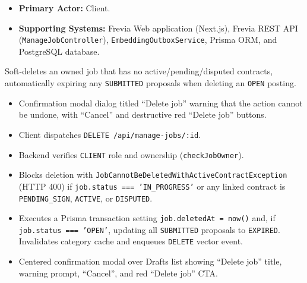 
\begin{itemize}[leftmargin=1.6em,topsep=3pt,itemsep=2pt,parsep=0pt,label=$\bullet$]
    \item \textbf{Primary Actor:} Client.
    \item \textbf{Supporting Systems:} Frevia Web application (Next.js), Frevia REST API (\texttt{ManageJobController}), \texttt{EmbeddingOutboxService}, Prisma ORM, and PostgreSQL database.
\end{itemize}

\noindent Soft-deletes an owned job that has no active/pending/disputed contracts, automatically expiring any \texttt{SUBMITTED} proposals when deleting an \texttt{OPEN} posting.

\begin{itemize}[leftmargin=1.6em,topsep=3pt,itemsep=2pt,parsep=0pt,label=$\bullet$]
    \item Confirmation modal dialog titled ``Delete job'' warning that the action cannot be undone, with ``Cancel'' and destructive red ``Delete job'' buttons.
\end{itemize}

\begin{itemize}[leftmargin=1.6em,topsep=3pt,itemsep=2pt,parsep=0pt,label=$\bullet$]
    \item Client dispatches \texttt{DELETE /api/manage-jobs/:id}.
    \item Backend verifies \texttt{CLIENT} role and ownership (\texttt{checkJobOwner}).
    \item Blocks deletion with \texttt{JobCannotBeDeletedWithActiveContractException} (HTTP 400) if \texttt{job.status === 'IN\_PROGRESS'} or any linked contract is \texttt{PENDING\_SIGN}, \texttt{ACTIVE}, or \texttt{DISPUTED}.
    \item Executes a Prisma transaction setting \texttt{job.deletedAt = now()} and, if \texttt{job.status === 'OPEN'}, updating all \texttt{SUBMITTED} proposals to \texttt{EXPIRED}. Invalidates category cache and enqueues \texttt{DELETE} vector event.
\end{itemize}

\begin{itemize}[leftmargin=1.6em,topsep=3pt,itemsep=2pt,parsep=0pt,label=$\bullet$]
    \item Centered confirmation modal over Drafts list showing ``Delete job'' title, warning prompt, ``Cancel'', and red ``Delete job'' CTA.
\end{itemize}

